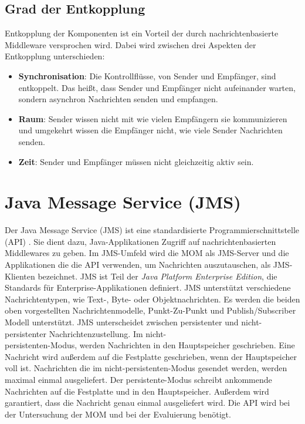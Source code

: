 \subsection{Grad der Entkopplung}
Entkopplung der Komponenten ist ein Vorteil der durch nachrichtenbasierte Middleware versprochen wird. Dabei wird zwischen drei Aspekten der Entkopplung \cite{Eugster03} unterschieden:
\begin{itemize}
    \item \textbf{Synchronisation}: Die Kontrollflüsse, von Sender und Empfänger, sind entkoppelt. Das heißt, dass Sender und Empfänger nicht aufeinander warten, sondern asynchron Nachrichten senden und empfangen.
    \item \textbf{Raum}: Sender wissen nicht mit wie vielen Empfängern sie kommunizieren und umgekehrt wissen die Empfänger nicht, wie viele Sender Nachrichten senden.
    \item \textbf{Zeit}: Sender und Empfänger müssen nicht gleichzeitig aktiv sein.
\end{itemize}

\section{Java Message Service (JMS)}
Der Java Message Service (JMS) ist eine standardisierte Programmierschnittstelle (API) \cite{jmsspec}. Sie dient dazu, Java-Applikationen Zugriff auf nachrichtenbasierten Middlewares zu geben. Im JMS-Umfeld wird die MOM als JMS-Server und die Applikationen die die API verwenden, um Nachrichten auszutauschen, als JMS-Klienten bezeichnet. JMS ist Teil der \emph{Java Platform Enterprise Edition}, die Standards für Enterprise-Applikationen definiert. JMS unterstützt verschiedene Nachrichtentypen, wie Text-, Byte- oder Objektnachrichten. Es werden die beiden oben vorgestellten Nachrichtenmodelle, Punkt-Zu-Punkt und Publish/Subscriber Modell unterstützt. JMS unterscheidet zwischen persistenter und nicht-persistenter Nachrichtenzustellung. Im nicht-\\persistenten-Modus, werden Nachrichten in den Hauptspeicher geschrieben. Eine Nachricht wird außerdem auf die Festplatte geschrieben, wenn der Hauptspeicher voll ist. Nachrichten die im nicht-persistenten-Modus gesendet werden, werden maximal einmal ausgeliefert. Der persistente-Modus schreibt ankommende Nachrichten auf die Festplatte und in den Hauptspeicher. Außerdem wird garantiert, dass die Nachricht genau einmal ausgeliefert wird. 
Die API wird bei der Untersuchung der MOM und bei der Evaluierung benötigt.

